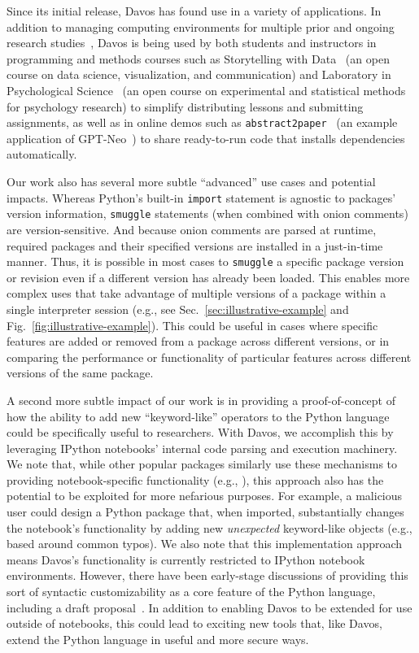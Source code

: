 \documentclass[preprint,12pt,a4paper]{elsarticle}
\begin{document}
Since its initial release, Davos has found use in a variety of
applications. In addition to managing computing environments for multiple prior
and ongoing research studies~\citep{MannEtal23, OwenMann23, ZimaEtal23},
Davos is being used by both students and instructors in programming
and methods courses such as Storytelling with Data~\cite{Mann21d} (an open
course on data science, visualization, and communication) and Laboratory in
Psychological Science~\cite{Mann22} (an open course on experimental and
statistical methods for psychology research) to simplify distributing lessons
and submitting assignments, as well as in online demos such as
\texttt{abstract2paper}~\cite{Mann21e} (an example application of
GPT-Neo~\cite{GaoEtal20, BlacEtal21}) to share ready-to-run code that installs
dependencies automatically.

Our work also has several more subtle ``advanced'' use cases and potential
impacts. Whereas Python's built-in \texttt{import} statement is agnostic to
packages' version information, \texttt{smuggle} statements (when combined with
onion comments) are version-sensitive. And because onion comments are parsed at
runtime, required packages and their specified versions are installed in a
just-in-time manner. Thus, it is possible in most cases to \texttt{smuggle} a
specific package version or revision even if a different version has already
been loaded. This enables more complex uses that take advantage of multiple
versions of a package within a single interpreter session (e.g., see
Sec.~\ref{sec:illustrative-example} and Fig.~\ref{fig:illustrative-example}).
This could be useful in cases where specific features are added or removed from
a package across different versions, or in comparing the performance or
functionality of particular features across different versions of the same
package.

A second more subtle impact of our work is in providing a
proof-of-concept of how the ability to add new ``keyword-like''
operators to the Python language could be specifically useful to
researchers. With Davos, we accomplish this by leveraging
IPython notebooks' internal code parsing and execution machinery. We
note that, while other popular packages similarly use these mechanisms
to providing notebook-specific functionality (e.g.,
\cite{Hunt07,HeusEtal18a}), this approach also has the potential to be
exploited for more nefarious purposes. For example, a malicious user
could design a Python package that, when imported, substantially
changes the notebook's functionality by adding new \textit{unexpected}
keyword-like objects (e.g., based around common typos). We also note
that this implementation approach means Davos's functionality
is currently restricted to IPython notebook environments. However,
there have been early-stage discussions of providing this sort of
syntactic customizability as a core feature of the Python language,
including a draft proposal~\cite{Shan20}. In addition to enabling
Davos to be extended for use outside of notebooks, this could
lead to exciting new tools that, like Davos, extend the
Python language in useful and more secure ways.
\end{document}
